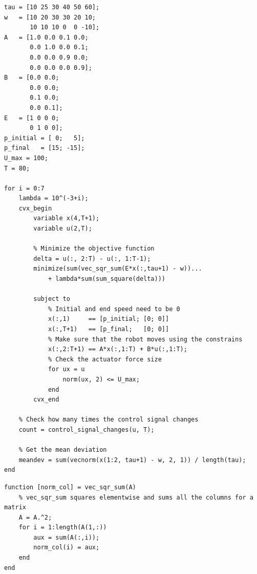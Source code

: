 \begin{lstlisting}[caption=Code for the Task 1., label=task1:code]
tau = [10 25 30 40 50 60];
w   = [10 20 30 30 20 10;
       10 10 10 0  0 -10];
A   = [1.0 0.0 0.1 0.0;
       0.0 1.0 0.0 0.1;
       0.0 0.0 0.9 0.0;
       0.0 0.0 0.0 0.9];
B   = [0.0 0.0;
       0.0 0.0;
       0.1 0.0;
       0.0 0.1];
E   = [1 0 0 0; 
       0 1 0 0];
p_initial = [ 0;   5];
p_final   = [15; -15];
U_max = 100;
T = 80;

for i = 0:7
    lambda = 10^(-3+i);
    cvx_begin
        variable x(4,T+1);
        variable u(2,T);

        % Minimize the objective function
        delta = u(:, 2:T) - u(:, 1:T-1);     
        minimize(sum(vec_sqr_sum(E*x(:,tau+1) - w))... 
            + lambda*sum(sum_square(delta))) 

        subject to
            % Initial and end speed need to be 0
            x(:,1)     == [p_initial; [0; 0]]
            x(:,T+1)   == [p_final;   [0; 0]]
            % Make sure that the robot moves using the constrains
            x(:,2:T+1) == A*x(:,1:T) + B*u(:,1:T);
            % Check the actuator force size
            for ux = u
                norm(ux, 2) <= U_max; 
            end
        cvx_end

    % Check how many times the control signal changes 
    count = control_signal_changes(u, T);

    % Get the mean deviation
    meandev = sum(vecnorm(x(1:2, tau+1) - w, 2, 1)) / length(tau);
end
\end{lstlisting}

\begin{lstlisting}[label=task1:code:vecsqrsum, caption=vec\_sqr\_sum function used in the Task 1., float=!htb]
function [norm_col] = vec_sqr_sum(A)
    % vec_sqr_sum squares elementwise and sums all the columns for a matrix 
    A = A.^2;
    for i = 1:length(A(1,:))
        aux = sum(A(:,i));
        norm_col(i) = aux;
    end
end
\end{lstlisting}

